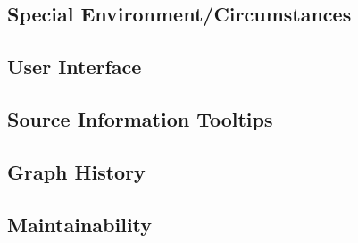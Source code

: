 \subsection{Special Environment/Circumstances}
	
\subsection{User Interface}
	
\subsection{Source Information Tooltips}

\subsection{Graph History}
	
\subsection{Maintainability}

